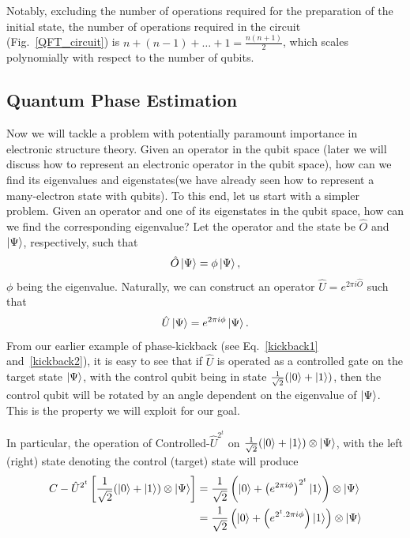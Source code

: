 \documentclass[12pt,oneside]{book}
\begin{document}
Notably, excluding the number of operations required for the preparation of the initial state, the number of operations required in the circuit (Fig.~\ref{QFT_circuit}) is $n + (n-1) + \hdots + 1=\frac{n(n+1)}{2}$, which scales polynomially with respect to the number of qubits.

\subsection*{Quantum Phase Estimation}

Now we will tackle a problem with potentially paramount importance in electronic structure theory. Given an operator in the qubit space (later we will discuss how to represent an electronic operator in the qubit space), how can we find its eigenvalues and eigenstates(we have already seen how to represent a many-electron state with qubits).
%
To this end, let us start with a simpler problem.
%
Given an operator and one of its eigenstates in the qubit space, how can we find the corresponding eigenvalue?
%
Let the operator and the state be $\hat{O}$ and $\ket{\Psi}$, respectively, such that 
\begin{align}
    \hat{O}\ket{\Psi}=\phi\ket{\Psi},
\end{align}
$\phi$ being the eigenvalue. Naturally, we can construct an operator $\hat{U}=e^{2\pi i \hat{O}}$ such that
\begin{align}
    \hat{U}\ket{\Psi}=e^{2\pi i \phi}\ket{\Psi}.
\end{align}
From our earlier example of phase-kickback (see Eq.~\ref{kickback1} and~\ref{kickback2}), it is easy to see that if $\hat{U}$ is operated as a controlled gate on the target state $\ket{\Psi}$, with the control qubit being in state $\frac{1}{\sqrt{2}}(\ket{0}+\ket{1})$, then the control qubit will be rotated by an angle dependent on the eigenvalue of $\ket{\Psi}$. This is the property we will exploit for our goal.

In particular, the operation of Controlled-$\hat{U}^{2^t}$ on $\frac{1}{\sqrt{2}}(\ket{0}+\ket{1}) \otimes \ket{\Psi}$, with the left (right) state denoting the control (target) state will produce
\begin{align*}
    C-\hat{U}^{2^t} \left[\frac{1}{\sqrt{2}}(\ket{0}+\ket{1}) \otimes \ket{\Psi}\right] &{} = \frac{1}{\sqrt{2}}\left(\ket{0}+\left(e^{2\pi i \phi}\right)^{2^t}\ket{1}\right) \otimes \ket{\Psi}\\
    &{} = \frac{1}{\sqrt{2}}\left(\ket{0}+\left(e^{2^t . 2\pi i \phi}\right)\ket{1}\right) \otimes \ket{\Psi}
\end{align*}
\end{document}
